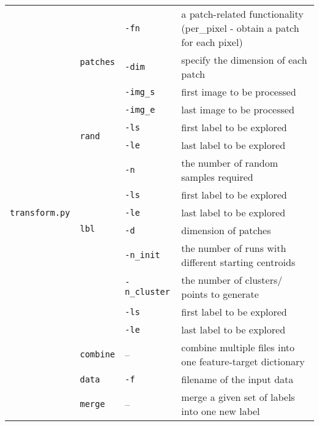 {{{\begin{tabular}{|m{}|m{}|m{}|m{}|}
    \multirow{17}{*}{\texttt{transform.py}} & \multirow{4}{*}{\texttt{patches}} & \texttt{-fn} & a patch-related functionality (per{\_}pixel - obtain a patch for each pixel)
    \\ \cline{3-4} & & \texttt{-dim} & specify the dimension of each patch
    \\ \cline{3-4} & & \texttt{-img{\_}s} & first image to be processed
    \\ \cline{3-4} & & \texttt{-img{\_}e} & last image to be processed
    \\ \cline{2-4}

    & \multirow{2}{*}{\texttt{rand}} & \texttt{-ls} & first label to be explored 
    \\ \cline{3-4} & & \texttt{-le} & last label to be explored 
    \\ \cline{3-4} & & \texttt{-n} & the number of random samples required
    \\ \cline{2-4}

    & \multirow{4}{*}{\texttt{lbl}} & \texttt{-ls} & first label to be explored 
    \\ \cline{3-4} & & \texttt{-le} & last label to be explored 
    \\ \cline{3-4} & & \texttt{-d} & dimension of patches
    \\ \cline{2-4}

    & \multirow{5}{*}{\texttt{pts}} & \texttt{-n{\_}init} & the number of runs with different starting centroids
    \\ \cline{3-4} & & \texttt{-n{\_}cluster} & the number of clusters/ points to generate 
    \\ \cline{3-4} & & \texttt{-ls} & first label to be explored 
    \\ \cline{3-4} & & \texttt{-le} & last label to be explored 
    \\ \cline{2-4}

    & \texttt{combine} & --  & combine multiple files into one feature-target dictionary
    \\ \cline{2-4}

    & \texttt{data} & \texttt{-f} & filename of the input data 
		\\ \cline{2-4}

    & \texttt{merge} & -- & merge a given set of labels into one new label


\end{tabular}}}}
